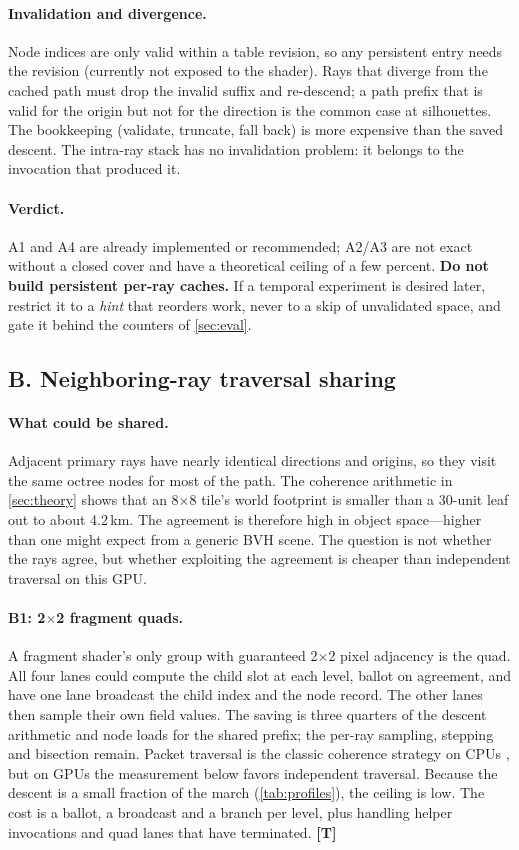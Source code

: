 \documentclass[11pt,a4paper]{article}
\newcommand{\evT}{\textsf{\textbf{\color{evT}[T]}}}
\theoremstyle{plain}
\theoremstyle{definition}
\theoremstyle{remark}
\begin{document}
\paragraph{Invalidation and divergence.} Node indices are only valid within a
table revision, so any persistent entry needs the revision (currently not
exposed to the shader). Rays that diverge from the cached path must drop the
invalid suffix and re-descend; a path prefix that is valid for the origin but
not for the direction is the common case at silhouettes. The bookkeeping
(validate, truncate, fall back) is more expensive than the saved descent. The
intra-ray stack has no invalidation problem: it belongs to the invocation that
produced it.

\paragraph{Verdict.} A1 and A4 are already implemented or recommended; A2/A3
are not exact without a closed cover and have a theoretical ceiling of a few
percent. \textbf{Do not build persistent per-ray caches.} If a temporal
experiment is desired later, restrict it to a \emph{hint} that reorders work,
never to a skip of unvalidated space, and gate it behind the counters of
\cref{sec:eval}.

\subsection{B. Neighboring-ray traversal sharing}
\label{sec:B}

\paragraph{What could be shared.} Adjacent primary rays have nearly identical
directions and origins, so they visit the same octree nodes for most of the
path. The coherence arithmetic in \cref{sec:theory} shows that an 8$\times$8
tile's world footprint is smaller than a 30-unit leaf out to about 4.2\,km.
The agreement is therefore high in object space---higher than one might expect
from a generic BVH scene. The question is not whether the rays agree, but
whether exploiting the agreement is cheaper than independent traversal on this
GPU.

\paragraph{B1: 2$\times$2 fragment quads.} A fragment shader's only group with
guaranteed 2$\times$2 pixel adjacency is the quad. All four lanes could compute
the child slot at each level, ballot on agreement, and have one lane broadcast
the child index and the node record. The other lanes then sample their own
field values. The saving is three quarters of the descent arithmetic and node
loads for the shared prefix; the per-ray sampling, stepping and bisection
remain. Packet traversal is the classic coherence strategy on CPUs
\cite{wald2001}, but on GPUs the measurement below favors independent
traversal. Because the descent is a small fraction of the march
(\cref{tab:profiles}), the ceiling is low. The cost is a ballot, a broadcast
and a branch per level, plus handling helper invocations and quad lanes that
have terminated. \evT
\end{document}
